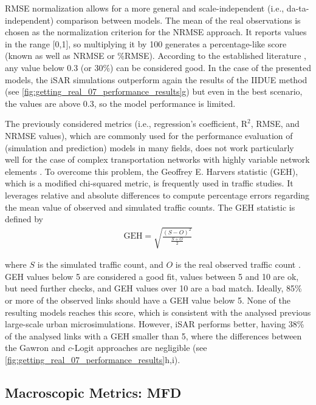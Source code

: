RMSE normalization allows for a more general and scale-independent (i.e., da-ta-independent) comparison between models. The mean of the real observations is chosen as the normalization criterion for the NRMSE approach. It reports values in the range [0,1], so multiplying it by 100 generates a percentage-like score (known as well as NRMSE or \%RMSE). According to the established literature \citep{MinisteriodeFomento2014,He2018,Li2015}, any value below 0.3 (or 30\%) can be considered good. In the case of the presented models, the iSAR simulations outperform again the results of the IIDUE method (see \autoref{fig:getting_real_07_performance_results}g) but even in the best scenario, the values are above 0.3, so the model performance is limited.

The previously considered metrics (i.e., regression’s coefficient, $\text{R}^2$, RMSE, and NRMSE values), which are commonly used for the performance evaluation of (simulation and prediction) models in many fields, does not work particularly well for the case of complex transportation networks with highly variable network elements \citep{Balakrishna2007}. To overcome this problem, the Geoffrey E. Harvers statistic (GEH), which is a modified chi-squared metric, is frequently used in traffic studies. It leverages relative and absolute differences to compute percentage errors regarding the mean value of observed and simulated traffic counts. The GEH statistic is defined by
\begin{align}
   \text{GEH} = \sqrt{\frac{(S - O)^2}{\frac{S + O}{2}}} \label{eq:GEH}
\end{align}

where $S$ is the simulated traffic count, and $O$ is the real observed traffic count \citep{DepartmentforTransportUKGovernment2020,Dowling2004}. GEH values below 5 are considered a good fit, values between 5 and 10 are ok, but need further checks, and GEH values over 10 are a bad match. Ideally, 85\% or more of the observed links should have a GEH value below 5. None of the resulting models reaches this score, which is consistent with the analysed previous large-scale urban microsimulations. However, iSAR performs better, having 38\% of the analysed links with a GEH smaller than 5, where the differences between the Gawron and $c$-Logit approaches are negligible (see \autoref{fig:getting_real_07_performance_results}h,i).

\subsection{Macroscopic Metrics: MFD}

